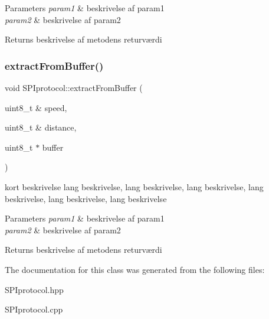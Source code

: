 \begin{DoxyParams}{Parameters}
{\em param1} & beskrivelse af param1 \\
\hline
{\em param2} & beskrivelse af param2 \\
\hline
\end{DoxyParams}
\begin{DoxyReturn}{Returns}
beskrivelse af metodens returværdi 
\end{DoxyReturn}
\mbox{\label{classSPIprotocol_ac1337db66f7bbe18a20b05b5d620ad6e}} 
\subsubsection{\texorpdfstring{extract\+From\+Buffer()}{extractFromBuffer()}}
{\footnotesize\ttfamily void S\+P\+Iprotocol\+::extract\+From\+Buffer (\begin{DoxyParamCaption}\item[{uint8\+\_\+t \&}]{speed,  }\item[{uint8\+\_\+t \&}]{distance,  }\item[{uint8\+\_\+t $\ast$}]{buffer }\end{DoxyParamCaption})\hspace{0.3cm}{\ttfamily [static]}}



kort beskrivelse lang beskrivelse, lang beskrivelse, lang beskrivelse, lang beskrivelse, lang beskrivelse, lang beskrivelse 


\begin{DoxyParams}{Parameters}
{\em param1} & beskrivelse af param1 \\
\hline
{\em param2} & beskrivelse af param2 \\
\hline
\end{DoxyParams}
\begin{DoxyReturn}{Returns}
beskrivelse af metodens returværdi 
\end{DoxyReturn}


The documentation for this class was generated from the following files\+:\begin{DoxyCompactItemize}
\item 
S\+P\+Iprotocol.\+hpp\item 
S\+P\+Iprotocol.\+cpp\end{DoxyCompactItemize}
